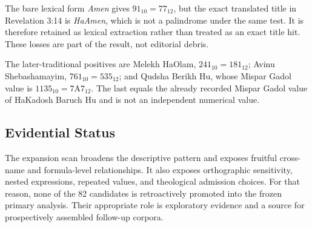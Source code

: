 The bare lexical form \textit{Amen} gives $91_{10}=77_{12}$, but the exact translated title in Revelation 3:14 is \textit{HaAmen}, which is not a palindrome under the same test. It is therefore retained as lexical extraction rather than treated as an exact title hit. These losses are part of the result, not editorial debris.

The later-traditional positives are Melekh HaOlam, $241_{10}=181_{12}$; Avinu Shebashamayim, $761_{10}=535_{12}$; and Qudsha Berikh Hu, whose Mispar Gadol value is $1135_{10}=7\mathrm{A}7_{12}$. The last equals the already recorded Mispar Gadol value of HaKadosh Baruch Hu and is not an independent numerical value.

\subsection{Evidential Status}

The expansion scan broadens the descriptive pattern and exposes fruitful cross-name and formula-level relationships. It also exposes orthographic sensitivity, nested expressions, repeated values, and theological admission choices. For that reason, none of the 82 candidates is retroactively promoted into the frozen primary analysis. Their appropriate role is exploratory evidence and a source for prospectively assembled follow-up corpora.
